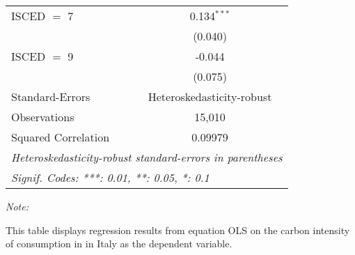 \begin{table}[htbp!]
\begin{adjustbox}{width = 1\textwidth, max height = 0.95\textheight, center}
\begin{threeparttable}[b]
\begin{tabular}{lc}
            ISCED $=$ 7         & 0.134$^{***}$\\   
                                & (0.040)\\   
            ISCED $=$ 9         & -0.044\\   
                                & (0.075)\\   
            \midrule 
            Standard-Errors     & Heteroskedasticity-robust \\   
            Observations        & 15,010\\  
            Squared Correlation & 0.09979\\  
            \midrule \midrule
            \multicolumn{2}{l}{\emph{Heteroskedasticity-robust standard-errors in parentheses}}\\
            \multicolumn{2}{l}{\emph{Signif. Codes: ***: 0.01, **: 0.05, *: 0.1}}\\
         \end{tabular}
         
         \begin{tablenotes}\item \medskip \textit{Note:}
            \item This table displays regression results from equation OLS on the carbon intensity of consumption in  in Italy as the dependent variable. 
         \end{tablenotes}
      \end{threeparttable}
   \end{adjustbox}
\end{table}


